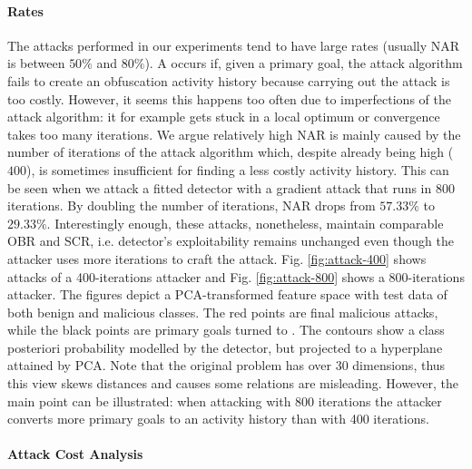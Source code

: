 \paragraph{\NA Rates}
The attacks performed in our experiments tend to have large \NA rates (usually NAR is between $50\%$ and $80\%$). A \NA occurs if, given a primary goal, the attack algorithm fails to create an obfuscation activity history because carrying out the attack is too costly. However, it seems this happens too often due to imperfections of the attack algorithm: it for example gets stuck in a local optimum or convergence takes too many iterations. We argue relatively high NAR is mainly caused by the number of iterations of the attack algorithm which, despite already being high ($400$), is sometimes insufficient for finding a less costly activity history. This can be seen when we attack a fitted detector with a gradient attack that runs in $800$ iterations. By doubling the number of iterations, NAR drops from $57.33\%$ to $29.33\%$. Interestingly enough, these attacks, nonetheless, maintain comparable OBR and SCR, i.e. detector's exploitability remains unchanged even though the attacker uses more iterations to craft the attack. Fig. \ref{fig:attack-400} shows attacks of a 400-iterations attacker and Fig. \ref{fig:attack-800} shows a 800-iterations attacker. The figures depict a PCA-transformed feature space with test data of both benign and malicious classes. The red points are final malicious attacks, while the black points are primary goals turned to \NA. The contours show a class posteriori probability modelled by the detector, but projected to a hyperplane attained by PCA. Note that the original problem has over 30 dimensions, thus this view skews distances and causes some relations are misleading. However, the main point can be illustrated: when attacking with 800 iterations the attacker converts more primary goals to an activity history than with 400 iterations.

\paragraph{Attack Cost Analysis}

